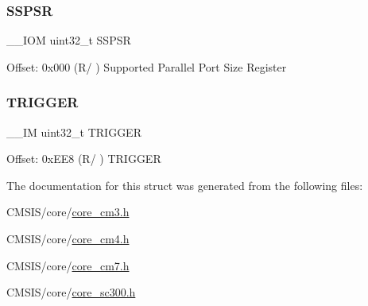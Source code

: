\subsubsection{\texorpdfstring{S\+S\+P\+SR}{SSPSR}}
{\footnotesize\ttfamily \+\_\+\+\_\+\+I\+OM uint32\+\_\+t S\+S\+P\+SR}

Offset\+: 0x000 (R/ ) Supported Parallel Port Size Register \mbox{\label{struct_t_p_i___type_a5590387d8f44b477fd69951a737b0d7e}} 
\subsubsection{\texorpdfstring{T\+R\+I\+G\+G\+ER}{TRIGGER}}
{\footnotesize\ttfamily \+\_\+\+\_\+\+IM uint32\+\_\+t T\+R\+I\+G\+G\+ER}

Offset\+: 0x\+E\+E8 (R/ ) T\+R\+I\+G\+G\+ER 

The documentation for this struct was generated from the following files\+:\begin{DoxyCompactItemize}
\item 
C\+M\+S\+I\+S/core/\hyperlink{core__cm3_8h}{core\+\_\+cm3.\+h}\item 
C\+M\+S\+I\+S/core/\hyperlink{core__cm4_8h}{core\+\_\+cm4.\+h}\item 
C\+M\+S\+I\+S/core/\hyperlink{core__cm7_8h}{core\+\_\+cm7.\+h}\item 
C\+M\+S\+I\+S/core/\hyperlink{core__sc300_8h}{core\+\_\+sc300.\+h}\end{DoxyCompactItemize}
